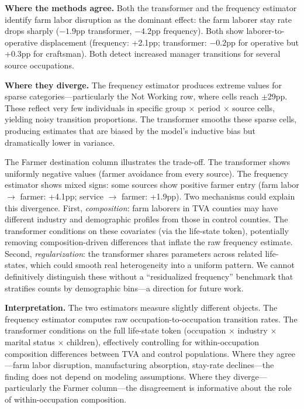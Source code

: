 \documentclass[12pt]{article}
\begin{document}
\textbf{Where the methods agree.} Both the transformer and the frequency estimator identify farm labor disruption as the dominant effect: the farm laborer stay rate drops sharply ($-1.9$pp transformer, $-4.2$pp frequency). Both show laborer-to-operative displacement (frequency: +2.1pp; transformer: $-0.2$pp for operative but +0.3pp for craftsman). Both detect increased manager transitions for several source occupations.

\textbf{Where they diverge.} The frequency estimator produces extreme values for sparse categories---particularly the Not Working row, where cells reach $\pm$29pp. These reflect very few individuals in specific group $\times$ period $\times$ source cells, yielding noisy transition proportions. The transformer smooths these sparse cells, producing estimates that are biased by the model's inductive bias but dramatically lower in variance.

The Farmer destination column illustrates the trade-off. The transformer shows uniformly negative values (farmer avoidance from every source). The frequency estimator shows mixed signs: some sources show positive farmer entry (farm labor $\to$ farmer: +4.1pp; service $\to$ farmer: +1.9pp). Two mechanisms could explain this divergence. First, \textit{composition}: farm laborers in TVA counties may have different industry and demographic profiles from those in control counties. The transformer conditions on these covariates (via the life-state token), potentially removing composition-driven differences that inflate the raw frequency estimate. Second, \textit{regularization}: the transformer shares parameters across related life-states, which could smooth real heterogeneity into a uniform pattern. We cannot definitively distinguish these without a ``residualized frequency'' benchmark that stratifies counts by demographic bins---a direction for future work.

\textbf{Interpretation.} The two estimators measure slightly different objects. The frequency estimator computes raw occupation-to-occupation transition rates. The transformer conditions on the full life-state token (occupation $\times$ industry $\times$ marital status $\times$ children), effectively controlling for within-occupation composition differences between TVA and control populations. Where they agree---farm labor disruption, manufacturing absorption, stay-rate declines---the finding does not depend on modeling assumptions. Where they diverge---particularly the Farmer column---the disagreement is informative about the role of within-occupation composition.
\end{document}
